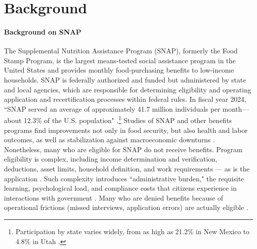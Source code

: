 \documentclass[manuscript,screen,authorversion]{acmart}
\begin{document}
\section{Background}
\paragraph{Background on SNAP}
The Supplemental Nutrition Assistance Program (SNAP), formerly the Food Stamp Program, is the largest means-tested social assistance program in the United States and provides monthly food-purchasing benefits to low-income households. SNAP is federally authorized and funded but administered by state and local agencies, which are responsible for determining eligibility and operating application and recertification processes within federal rules. In fiscal year 2024, ``SNAP served an average of approximately 41.7 million individuals per month—about 12.3\% of the U.S. population" \citep{ers_snap_key_stats}.\footnote{Participation by state varies widely, from as high as 21.2\% in New Mexico to 4.8\% in Utah \citep{ers_snap_state_variation}.} Studies of SNAP and other benefits programs find improvements not only in food security, but also health and labor outcomes, as well as stabilization against macroeconomic downturns \citep{hoynes2015us}. Nonetheless, many who are eligible for SNAP do not receive benefits. Program eligibility is complex, including income determination and verification, deductions, asset limits, household definition, and work requirements --- as is the application \citep{crs_snap_r42505}. Such complexity introduces ``administrative burden,"  the requisite learning, psychological load, and compliance costs that citizens experience in interactions with government \citep{herd2025administrative}. 
Many who are denied benefits because of operational frictions (missed interviews, application errors) are actually eligible \citep{homonoff2021program}. %
\end{document}
